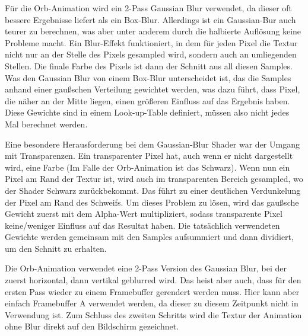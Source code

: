 Für die Orb-Animation wird ein 2-Pass Gaussian Blur verwendet, da dieser oft bessere Ergebnisse liefert als \zB ein
Box-Blur.
Allerdings ist ein Gaussian-Bur auch teurer zu berechnen, was aber unter anderem durch die halbierte Auflösung keine
Probleme macht.
Ein Blur-Effekt funktioniert, in dem für jeden Pixel die Textur nicht nur an der Stelle des Pixels gesampled wird,
sondern auch an umliegenden Stellen.
Die finale Farbe des Pixels ist dann der Schnitt aus all diesen Samples.
Was den Gaussian Blur von \ua einem Box-Blur unterscheidet ist, das die Samples anhand einer gaußschen Verteilung
gewichtet werden, was dazu führt, dass Pixel, die näher an der Mitte liegen, einen größeren Einfluss auf das Ergebnis
haben.
Diese Gewichte sind in einem Look-up-Table definiert, müssen also nicht jedes Mal berechnet werden.

Eine besondere Herausforderung bei dem Gaussian-Blur Shader war der Umgang mit Transparenzen.
Ein transparenter Pixel hat, auch wenn er nicht dargestellt wird, eine Farbe (Im Falle der Orb-Animation ist das Schwarz).
Wenn nun ein Pixel am Rand der Textur ist, wird auch im transparenten Bereich gesampled,
wo der Shader Schwarz zurückbekommt.
Das führt zu einer deutlichen Verdunkelung der Pixel am Rand des Schweifs.
Um dieses Problem zu lösen, wird das gaußsche Gewicht zuerst mit dem Alpha-Wert multipliziert, sodass transparente Pixel
keine/weniger Einfluss auf das Resultat haben.
Die tatsächlich verwendeten Gewichte werden gemeinsam mit den Samples aufsummiert und dann dividiert, um den Schnitt zu
erhalten.

Die Orb-Animation verwendet eine 2-Pass Version des Gaussian Blur, bei der zuerst horizontal, dann vertikal geblurred
wird.
Das heist aber auch, dass für den ersten Pass wieder zu einem Framebuffer gerendert werden muss.
Hier kann aber einfach Framebuffer A verwendet werden, da dieser zu diesem Zeitpunkt nicht in Verwendung ist.
Zum Schluss des zweiten Schritts wird die Textur der Animation ohne Blur direkt auf den Bildschirm gezeichnet.

\renewcommand{\kapitelautor}{}
